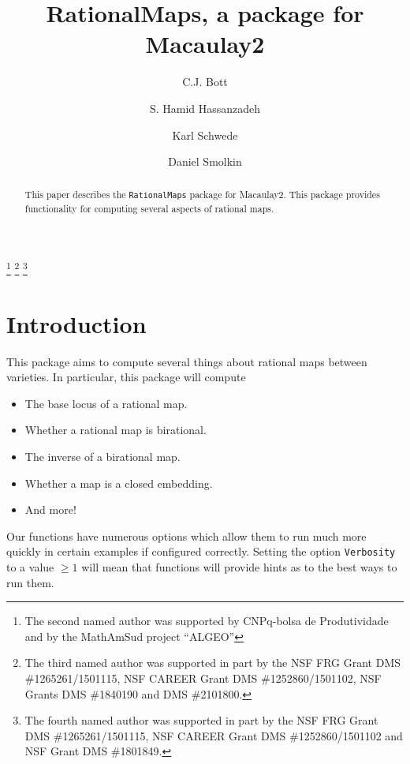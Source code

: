 \documentclass[11pt]{amsart}%
\numberwithin{equation}{theorem}
\renewcommand{\:}{\colon}
\theoremstyle{theorem}
\begin{document}
\title{RationalMaps, a package for Macaulay2}
\author{C.J. Bott}
\author{S. Hamid Hassanzadeh}
\author{Karl Schwede}
\author{Daniel Smolkin}
\address{Department of Mathematics\\Mailstop 3368\\Texas A\&M University\\College Station, TX 77843-3368}
\address{Department of Mathematics\\Federal University of Rio de Janeiro\\Brazil}
\address{Department of Mathematics\\ University of Utah\\ Salt Lake City\\ UT 84112}
\address{Department of Mathematics\\ University of Michigan\\ Ann Arbor\\ UT 48109}

\thanks{The second named author was supported by CNPq-bolsa de Produtividade and by the MathAmSud project ``ALGEO''}
\thanks{The third named author was supported in part by the NSF FRG Grant DMS \#1265261/1501115, NSF CAREER Grant DMS \#1252860/1501102, NSF Grants DMS \#1840190 and DMS \#2101800.}
\thanks{The fourth named author was supported in part by the NSF FRG Grant DMS \#1265261/1501115, NSF CAREER Grant DMS \#1252860/1501102 and NSF Grant DMS \#1801849.}


\begin{abstract}
This paper describes the {\tt RationalMaps} package for Macaulay2.  This package provides functionality for computing several aspects of rational maps.
\end{abstract}
\maketitle


\section{Introduction}


This package aims to compute several things about rational maps between varieties.  In particular, this package will compute
\begin{itemize}
\item{} The base locus of a rational map.
\item{} Whether a rational map is birational.
\item{} The inverse of a birational map.
\item{} Whether a map is a closed embedding.
\item{} And more!
\end{itemize}
Our functions have numerous options which allow them to run much more quickly in certain examples if configured correctly.  Setting the option {\tt Verbosity} to a value $\geq 1$ will mean that functions will provide hints as to the best ways to run them.
\end{document}
